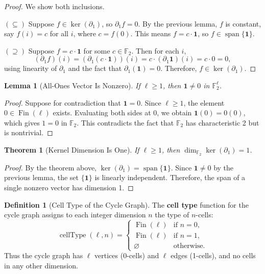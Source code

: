 \documentclass[11pt]{article}
\theoremstyle{plain}
\newtheorem*{theorem}{Theorem}
\newtheorem*{lemma}{Lemma}
\theoremstyle{definition}
\newtheorem*{definition}{Definition}
\theoremstyle{remark}
\renewcommand{\ker}{\operatorname{ker}}
\begin{document}
\begin{proof}
We show both inclusions.

$(\subseteq)$ Suppose $f \in \ker(\partial_1)$, so $\partial_1 f = 0$. By the previous lemma, $f$ is constant, say $f(i) = c$ for all $i$, where $c = f(0)$. This means $f = c \cdot \mathbf{1}$, so $f \in \operatorname{span}\{\mathbf{1}\}$.

$(\supseteq)$ Suppose $f = c \cdot \mathbf{1}$ for some $c \in \mathbb{F}_2$. Then for each $i$,
\[
(\partial_1 f)(i) = (\partial_1(c \cdot \mathbf{1}))(i) = c \cdot (\partial_1 \mathbf{1})(i) = c \cdot 0 = 0,
\]
using linearity of $\partial_1$ and the fact that $\partial_1(\mathbf{1}) = 0$. Therefore, $f \in \ker(\partial_1)$.
\end{proof}

\begin{lemma}[All-Ones Vector Is Nonzero]
If $\ell \geq 1$, then $\mathbf{1} \neq 0$ in $\mathbb{F}_2^\ell$.
\end{lemma}

\begin{proof}
Suppose for contradiction that $\mathbf{1} = 0$. Since $\ell \geq 1$, the element $0 \in \operatorname{Fin}(\ell)$ exists. Evaluating both sides at $0$, we obtain $\mathbf{1}(0) = 0(0)$, which gives $1 = 0$ in $\mathbb{F}_2$. This contradicts the fact that $\mathbb{F}_2$ has characteristic 2 but is nontrivial.
\end{proof}

\begin{theorem}[Kernel Dimension Is One]
If $\ell \geq 1$, then $\dim_{\mathbb{F}_2} \ker(\partial_1) = 1$.
\end{theorem}

\begin{proof}
By the theorem above, $\ker(\partial_1) = \operatorname{span}\{\mathbf{1}\}$. Since $\mathbf{1} \neq 0$ by the previous lemma, the set $\{\mathbf{1}\}$ is linearly independent. Therefore, the span of a single nonzero vector has dimension 1.
\end{proof}

\begin{definition}[Cell Type of the Cycle Graph]
The \textbf{cell type} function for the cycle graph assigns to each integer dimension $n$ the type of $n$-cells:
\[
\operatorname{cellType}(\ell, n) = \begin{cases} 
\operatorname{Fin}(\ell) & \text{if } n = 0,\\ 
\operatorname{Fin}(\ell) & \text{if } n = 1,\\ 
\varnothing & \text{otherwise.}
\end{cases}
\]
Thus the cycle graph has $\ell$ vertices (0-cells) and $\ell$ edges (1-cells), and no cells in any other dimension.
\end{definition}
\end{document}
